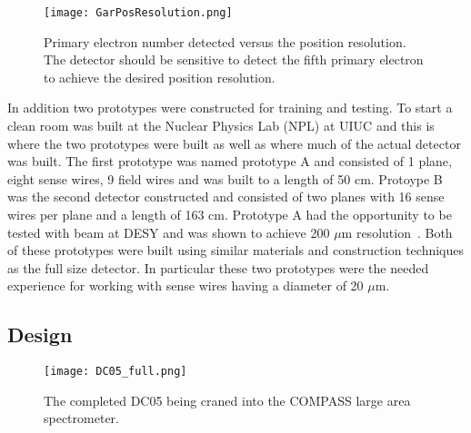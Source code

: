 \documentclass[aps,prl,twocolumn,groupedaddress]{revtex4-1}
\begin{document}
\begin{figure}
  \centering
  \texttt{[image: GarPosResolution.png]}
  \caption{}{Primary electron number detected versus the position resolution.  The detector should be sensitive to detect the fifth primary electron to achieve the desired position resolution. }
  \label{fig:PosRes}%
\end{figure}

In addition two prototypes were constructed for training and testing.  To start
a clean room was built at the Nuclear Physics Lab (NPL) at UIUC and this is
where the two prototypes were built as well as where much of the actual detector
was built.  The first prototype was named prototype A and consisted of 1 plane,
eight sense wires, 9 field wires and was built to a length of 50 cm.  Protoype B
was the second detector constructed and consisted of two planes with 16 sense
wires per plane and a length of 163 cm.  Prototype A had the opportunity to be
tested with beam at DESY and was shown to achieve 200 $\mu$m resolution~\cite{choi}.  Both
of these prototypes were built using similar materials and construction
techniques as the full size detector.  In particular these two prototypes were
the needed experience for working with sense wires having a diameter of
20 $\mu$m.
\subsection{Design}

\begin{figure}
  \centering
  \texttt{[image: DC05\_full.png]}
  \caption{}{The completed DC05 being craned into the COMPASS large area spectrometer.}
  \label{fig:DC05}%
\end{figure}
\end{document}
